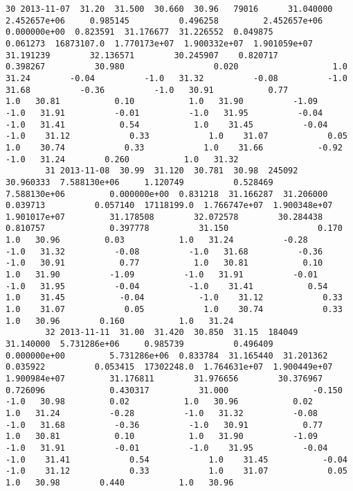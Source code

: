 \documentclass[11pt]{article}
\begin{document}
\begin{Verbatim}[commandchars=\\\{\}]
        30 2013-11-07  31.20  31.500  30.660  30.96   79016      31.040000  2.452657e+06     0.985145          0.496258         2.452657e+06         0.000000e+00  0.823591  31.176677  31.226552  0.049875          0.061273  16873107.0  1.770173e+07  1.900332e+07  1.901059e+07         31.191239        32.136571        30.245907    0.820717             0.398267          30.980                  0.020                   1.0   31.24        -0.04          -1.0   31.32          -0.08          -1.0   31.68          -0.36          -1.0   30.91           0.77           1.0   30.81           0.10           1.0   31.90          -1.09          -1.0   31.91          -0.01          -1.0   31.95          -0.04          -1.0   31.41           0.54           1.0    31.45          -0.04           -1.0    31.12            0.33            1.0    31.07            0.05            1.0    30.74            0.33            1.0    31.66           -0.92           -1.0   31.24        0.260           1.0   31.32   
        31 2013-11-08  30.99  31.120  30.781  30.98  245092      30.960333  7.588130e+06     1.120749          0.528469         7.588130e+06         0.000000e+00  0.831218  31.166287  31.206000  0.039713          0.057140  17118199.0  1.766747e+07  1.900348e+07  1.901017e+07         31.178508        32.072578        30.284438    0.810757             0.397778          31.150                  0.170                   1.0   30.96         0.03           1.0   31.24          -0.28          -1.0   31.32          -0.08          -1.0   31.68          -0.36          -1.0   30.91           0.77           1.0   30.81           0.10           1.0   31.90          -1.09          -1.0   31.91          -0.01          -1.0   31.95          -0.04          -1.0    31.41           0.54            1.0    31.45           -0.04           -1.0    31.12            0.33            1.0    31.07            0.05            1.0    30.74            0.33            1.0   30.96        0.160           1.0   31.24   
        32 2013-11-11  31.00  31.420  30.850  31.15  184049      31.140000  5.731286e+06     0.985739          0.496409         0.000000e+00         5.731286e+06  0.833784  31.165440  31.201362  0.035922          0.053415  17302248.0  1.764631e+07  1.900449e+07  1.900984e+07         31.176811        31.976656        30.376967    0.726096             0.430317          31.000                 -0.150                  -1.0   30.98         0.02           1.0   30.96           0.02           1.0   31.24          -0.28          -1.0   31.32          -0.08          -1.0   31.68          -0.36          -1.0   30.91           0.77           1.0   30.81           0.10           1.0   31.90          -1.09          -1.0   31.91          -0.01          -1.0    31.95          -0.04           -1.0    31.41            0.54            1.0    31.45           -0.04           -1.0    31.12            0.33            1.0    31.07            0.05            1.0   30.98        0.440           1.0   30.96   

\end{Verbatim}
\end{document}
